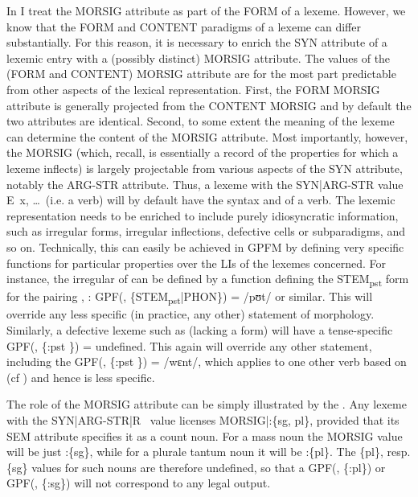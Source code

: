 \documentclass[output=paper,
modfonts
]{LSP/langsci}
\begin{document}
In \citet{Spencer13:book} I treat the MORSIG attribute as part of the FORM  of a lexeme. However, we know that the FORM and CONTENT paradigms of a lexeme can differ substantially. For this reason, it is necessary to enrich the SYN attribute of a lexemic entry with a (possibly distinct) MORSIG attribute. 
The values of the (FORM and CONTENT) MORSIG attribute are for the most part predictable from other aspects of the lexical representation. First, the FORM MORSIG attribute is generally projected from the CONTENT MORSIG and by default the two attributes are identical. Second, to some extent the meaning of the lexeme can determine the content of the MORSIG attribute. Most importantly, however, the MORSIG (which, recall, is essentially a record of the properties for which a lexeme inflects) is largely projectable from various aspects of the SYN attribute, notably the ARG-STR attribute. Thus, a lexeme with the SYN|ARG-STR value \lab E\lab\ x, \ldots\rab\rab\ (i.e. a verb) will by default have the syntax and  of a verb. The lexemic representation needs to be enriched to include purely idiosyncratic information, such as irregular  forms, irregular inflections, defective cells or subparadigms, and so on. Technically, this can easily be achieved in GPFM by defining very specific functions for particular properties over the LIs of the lexemes concerned. For instance, the irregular  of  can be defined by a function  defining the  STEM\textsubscript{pst} form for the pairing \lab{}, \rab: GPF(\lab{},  \{STEM\textsubscript{pst}|PHON\}\rab) = /pʊt/ or similar. This will override any less specific (in practice, any other) statement of  morphology. Similarly, a defective lexeme such as  (lacking a  form) will have a tense-specific GPF(\lab{}, \{:pst \}\rab) = \textsf{undefined}. This again will override any other statement, including the GPF(\lab{}, \{:pst \}\rab) = /wɛnt/, which applies to one other verb based on  (cf ) and hence is less specific.

The role of the MORSIG attribute can be simply illustrated by the  . Any lexeme with the SYN|ARG-STR|\lab R \rab\ value licenses MORSIG|:\{sg, pl\}, provided that its SEM attribute specifies it as a count noun. For a mass noun the MORSIG value will be just :\{sg\}, while for a plurale tantum noun it will be :\{pl\}. The \{pl\}, resp. \{sg\} values for such nouns are therefore undefined, so that a GPF(\lab{}, \{:pl\}\rab) or %
GPF(\lab{}, \{:sg\}\rab) will not correspond to any legal output.
\end{document}
